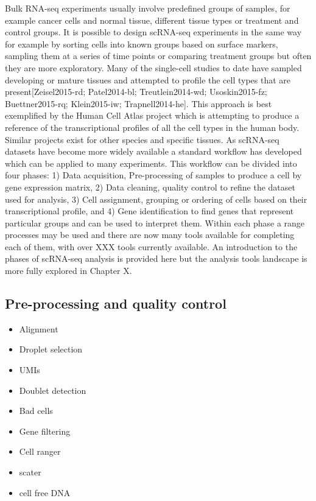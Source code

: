 \documentclass[11pt,a4paper,titlepage,twoside,openright]{style/unimelbthesis}
\theoremstyle{definition}
\theoremstyle{definition}
\theoremstyle{definition}
\theoremstyle{remark}
\begin{document}
\begin{mainmatter}
Bulk RNA-seq experiments usually involve predefined groups of samples, for example cancer cells and normal tissue, different tissue types or treatment and control groups. It is possible to design scRNA-seq experiments in the same way for example by sorting cells into known groups based on surface markers, sampling them at a series of time points or comparing treatment groups but often they are more exploratory. Many of the single-cell studies to date have sampled developing or mature tissues and attempted to profile the cell types that are present{[}Zeisel2015-rd; Patel2014-bl; Treutlein2014-wd; Usoskin2015-fz; Buettner2015-rq; Klein2015-iw; Trapnell2014-he{]}. This approach is best exemplified by the Human Cell Atlas project which is attempting to produce a reference of the transcriptional profiles of all the cell types in the human body. Similar projects exist for other species and specific tissues. As scRNA-seq datasets have become more widely available a standard workflow has developed which can be applied to many experiments. This workflow can be divided into four phases: 1) Data acquisition, Pre-processing of samples to produce a cell by gene expression matrix, 2) Data cleaning, quality control to refine the dataset used for analysis, 3) Cell assignment, grouping or ordering of cells based on their transcriptional profile, and 4) Gene identification to find genes that represent particular groups and can be used to interpret them. Within each phase a range processes may be used and there are now many tools available for completing each of them, with over XXX tools currently available. An introduction to the phases of scRNA-seq analysis is provided here but the analysis tools landscape is more fully explored in Chapter X.

\hypertarget{pre-processing-and-quality-control}{%
\subsection{Pre-processing and quality control}\label{pre-processing-and-quality-control}}

\begin{itemize}
\tightlist
\item
  Alignment
\item
  Droplet selection
\item
  UMIs
\item
  Doublet detection
\item
  Bad cells
\item
  Gene filtering
\item
  Cell ranger
\item
  scater
\item
  cell free DNA
\end{itemize}


\end{mainmatter}
\end{document}
